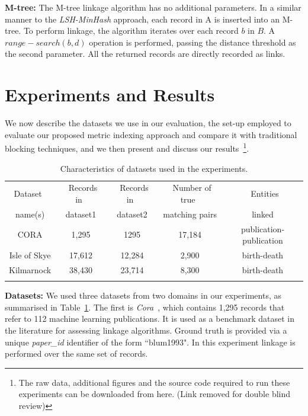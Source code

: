 \documentclass{llncs}
\begin{document}
\textbf{M-tree:} The M-tree linkage algorithm has no additional
parameters. In a similar manner to the \emph{LSH-MinHash} approach, each
record in A is inserted into an M-tree. To perform linkage, the
algorithm iterates over each record $b$ in $B$. A $range-search(b,d)$
operation is performed, passing the distance threshold as the second
parameter. All the returned records are directly recorded as links.


\section{Experiments and Results}
\label{sec-exp}

We now describe the datasets we use in our evaluation, the set-up
employed to evaluate our proposed metric indexing approach and compare
it with traditional blocking techniques, and we then present and discuss
our results~\footnote{The raw data, additional figures and the source
code required to run these experiments can be downloaded from here.
(Link removed for double blind review)}.


\begin{table}[t]
\caption{Characteristics of datasets used in the experiments.}
 \label{table-datasets}
  \centering
  \begin{scriptsize}
  \begin{tabular}{ccccc}
  \hline\noalign{\smallskip}
  Dataset~ & ~Records in~& ~Records in~ & ~Number of true~& ~Entities\\
  name(s)  & dataset1  & dataset2  & matching pairs & linked \\
  \noalign{\smallskip} \hline \noalign{\smallskip}
  CORA  & 1,295 & 1295 & 17,184 & publication-publication\\
  Isle of Skye & 17,612 & 12,284& 2,900 & birth-death\\
  Kilmarnock  & 38,430 & 23,714 & 8,300 & birth-death\\
  \noalign{\smallskip} \hline
  \end{tabular}
  \end{scriptsize}
\end{table}

\smallskip
\textbf{Datasets:}
\label{sec-data}
We used three datasets from two domains in our experiments, as
summarised in Table~\ref{table-datasets}. The first is
\emph{Cora}~\cite{Cora2017}, which contains 1,295 records that refer to
112 machine learning publications. It is used as a benchmark dataset in
the literature for assessing linkage algorithms. Ground truth is
provided via a unique \emph{paper\_id} identifier of the form
``blum1993". In this experiment linkage is performed over the same set
of records.
\end{document}
